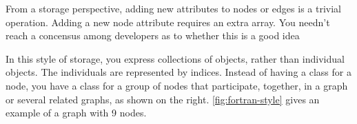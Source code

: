  


\newcommand{\light}[1]{\footnotesize{\textcolor{Lighter}{#1}}}

From a storage perspective, adding new attributes to nodes or edges is a trivial
operation. Adding a new node attribute requires an extra array. You needn't
reach a concensus among developers as to whether this is a good idea

In this style
of storage, you express collections of objects, rather than individual objects.
The individuals are represented by indices. Instead of having a class for a
node, you have a class for a group of nodes that participate, together, in a
graph or several related graphs, as shown on the right.
\autoref{fig:fortran-style} gives an example of a graph with 9 nodes.

